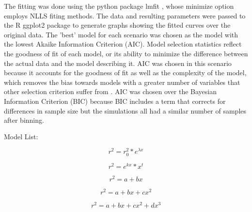 \documentclass[11pt]{article}
\begin{document}
\begin{linenumbers}
The fitting was done using the python package lmfit \citep{newville2016lmfit}, whose minimize option employs NLLS fiting methods. The data and resulting parameters were passed to the R ggplot2 package to generate graphs showing the fitted curves over the original data. The 'best' model for each scenario was chosen as the model with the lowest Akaike Information Criterion (AIC). Model selection statistics reflect the goodness of fit of each model, or its ability to minimize the difference between the actual data and the model describing it. AIC was chosen in this scenario because it accounts for the goodness of fit as well as the complexity of the model, which removes the bias towards models with a greater number of variables that other selection criterion suffer from \citep{johnson2004model}. AIC was chosen over the Bayesian Information Criterion (BIC) because BIC includes a term that corrects for differences in sample size but the simulations all had a similar number of samples after binning. 

Model List:

\begin{equation} \label{eq:EXP}
r^2 = r^2_0 * e^{\lambda x}
\end{equation}

\begin{equation} \label{eq:GAM}
r^2 = e^{k x} * x^t
\end{equation}

\begin{equation} \label{eq:POLY1}
r^2 = a + bx
\end{equation}

\begin{equation} \label{eq:POLY2}
r^2 = a + bx + cx^2
\end{equation}

\begin{equation} \label{eq:POLY3}
r^2 = a + bx + cx^2 + dx^3
\end{equation}


\end{linenumbers}
\end{document}
